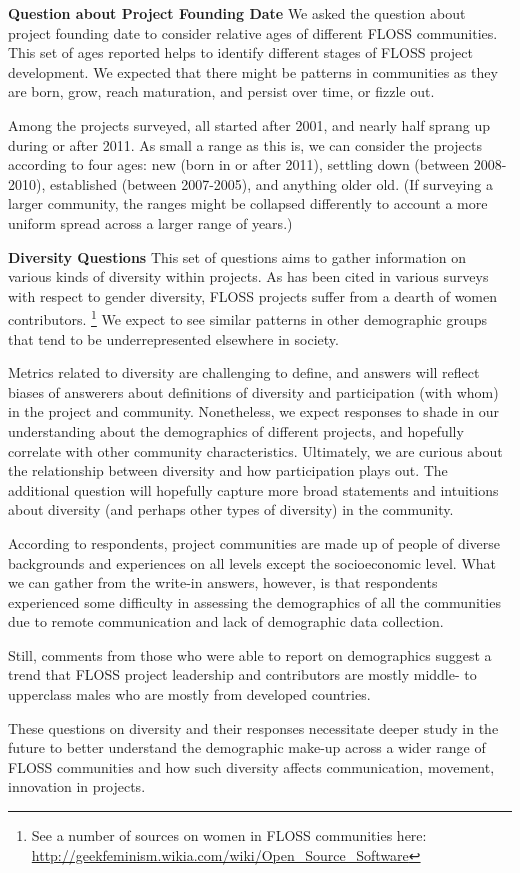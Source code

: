 
{\bf Question about Project Founding Date}
We asked the question about project founding date to consider relative ages of different FLOSS communities. This set of ages reported helps to identify different stages of FLOSS project development. We expected that there might be patterns in communities as they are born, grow, reach maturation, and persist over time, or fizzle out. 

Among the projects surveyed, all started after 2001, and nearly half sprang up during or after 2011. As small a range as this is, we can consider the projects according to four ages: new (born in or after 2011), settling down (between 2008-2010), established (between 2007-2005), and anything older old. (If surveying a larger community, the ranges might be collapsed differently to account a more uniform spread across a larger range of years.)

{\bf Diversity Questions}
This set of questions aims to gather information on various kinds of diversity within projects. As has been cited in various surveys with respect to gender diversity, FLOSS projects suffer from a dearth of women contributors. \footnote{See a number of sources on women in FLOSS communities here: \url{http://geekfeminism.wikia.com/wiki/Open_Source_Software}} We expect to see similar patterns in other demographic groups that tend to be underrepresented elsewhere in society.

Metrics related to diversity are challenging to define, and answers will reflect biases of answerers about definitions of diversity and participation (with whom) in the project and community. Nonetheless, we expect responses to shade in our understanding about the demographics of different projects, and hopefully correlate with other community characteristics. Ultimately, we are curious about the relationship between diversity and how participation plays out. The additional question will hopefully capture more broad statements and intuitions about diversity (and perhaps other types of diversity) in the community.

According to respondents, project communities are made up of people of diverse backgrounds and experiences on all levels except the socioeconomic level. What we can gather from the write-in answers, however, is that respondents experienced some difficulty in assessing the demographics of all the communities due to remote communication and lack of demographic data collection. 

Still, comments from those who were able to report on demographics suggest a trend that FLOSS project leadership and contributors are mostly middle- to upperclass males who are mostly from developed countries. 

These questions on diversity and their responses necessitate deeper study in the future to better understand the demographic make-up across a wider range of FLOSS communities and how such diversity affects communication, movement, innovation in projects. 


